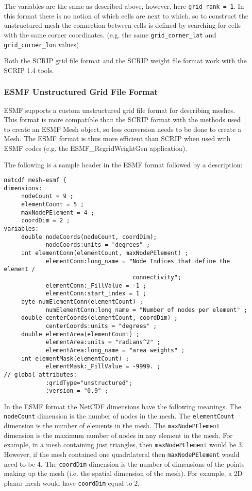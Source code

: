 The variables are the same as described above, however, here {\tt grid\_rank = 1}. In this format there
is no notion of which cells are next to which, so to construct the unstructured mesh the connection between
cells is defined by searching for cells with the same corner coordinates. (e.g. the same {\tt grid\_corner\_lat}
and {\tt grid\_corner\_lon} values).

Both the SCRIP grid file format and the SCRIP weight file format work with the SCRIP 1.4 tools.

\subsubsection{ESMF Unstructured Grid File Format}\label{sec:fileformat:esmf}

ESMF supports a custom unstructured grid file format for describing meshes. This format is more compatible than the SCRIP format with the methods used to create an ESMF Mesh object, so less conversion needs to be done to create a Mesh.
The ESMF format is thus more efficient than SCRIP when used with ESMF codes (e.g. the ESMF\_RegridWeightGen application). 

The following is a sample header in the ESMF format followed by a description:

\begin{verbatim}
netcdf mesh-esmf {
dimensions:
     nodeCount = 9 ;
     elementCount = 5 ;
     maxNodePElement = 4 ;
     coordDim = 2 ;
variables:
     double nodeCoords(nodeCount, coordDim);
            nodeCoords:units = "degrees" ;
     int elementConn(elementCount, maxNodePElement) ;
            elementConn:long_name = "Node Indices that define the element /
                                     connectivity";
            elementConn:_FillValue = -1 ;
            elementConn:start_index = 1 ;
     byte numElementConn(elementCount) ;
            numElementConn:long_name = "Number of nodes per element" ;
     double centerCoords(elementCount, coordDim) ;
            centerCoords:units = "degrees" ;
     double elementArea(elementCount) ;
            elementArea:units = "radians^2" ;
            elementArea:long_name = "area weights" ;
     int elementMask(elementCount) ;
            elementMask:_FillValue = -9999. ;
// global attributes:
            :gridType="unstructured";
            :version = "0.9" ;
\end{verbatim}

 In the ESMF format the NetCDF dimensions have the following meanings. The {\tt nodeCount} dimension is the number of nodes in the mesh.
 The {\tt elementCount} dimension is the number of elements in the mesh. The {\tt maxNodePElement} dimension is the maximum number
 of nodes in any element in the mesh. For example, in a mesh containing just triangles, then {\tt maxNodePElement} would be 3. However,
 if the mesh contained one quadrilateral then {\tt maxNodePElement} would need to be 4. The {\tt coordDim} dimension is the number of dimensions
 of the points making up the mesh (i.e. the spatial dimension of the mesh). For example, a 2D planar mesh would have {\tt coordDim} equal to 2.  

